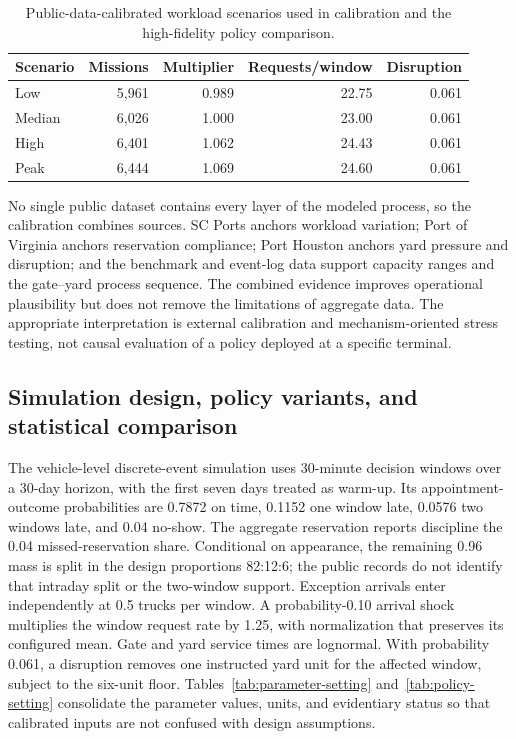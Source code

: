 \documentclass[preprint,12pt,authoryear,a4paper]{elsarticle}
\begin{document}
\begin{table}[htbp]
\centering
\caption{Public-data-calibrated workload scenarios used in calibration and the high-fidelity policy comparison.}
\label{tab:calibration-scenarios}
\footnotesize
\begin{tabular*}{\textwidth}{@{\extracolsep{\fill}}lrrrr@{}}
\toprule
Scenario & Missions & Multiplier & Requests/window & Disruption \\
\midrule
Low    & 5,961 & 0.989 & 22.75 & 0.061 \\
Median & 6,026 & 1.000 & 23.00 & 0.061 \\
High   & 6,401 & 1.062 & 24.43 & 0.061 \\
Peak   & 6,444 & 1.069 & 24.60 & 0.061 \\
\bottomrule
\end{tabular*}
\end{table}

No single public dataset contains every layer of the modeled process, so the calibration combines sources. SC Ports anchors workload variation; Port of Virginia anchors reservation compliance; Port Houston anchors yard pressure and disruption; and the benchmark and event-log data support capacity ranges and the gate--yard process sequence. The combined evidence improves operational plausibility but does not remove the limitations of aggregate data. The appropriate interpretation is external calibration and mechanism-oriented stress testing, not causal evaluation of a policy deployed at a specific terminal.

\subsection{Simulation design, policy variants, and statistical comparison}
\label{subsec:6-2-simulation-design-policies-and-statistical-comparison}

The vehicle-level discrete-event simulation uses 30-minute decision windows over a 30-day horizon, with the first seven days treated as warm-up. Its appointment-outcome probabilities are 0.7872 on time, 0.1152 one window late, 0.0576 two windows late, and 0.04 no-show. The aggregate reservation reports discipline the 0.04 missed-reservation share. Conditional on appearance, the remaining 0.96 mass is split in the design proportions 82:12:6; the public records do not identify that intraday split or the two-window support. Exception arrivals enter independently at 0.5 trucks per window. A probability-0.10 arrival shock multiplies the window request rate by 1.25, with normalization that preserves its configured mean. Gate and yard service times are lognormal. With probability 0.061, a disruption removes one instructed yard unit for the affected window, subject to the six-unit floor. Tables~\ref{tab:parameter-setting} and~\ref{tab:policy-setting} consolidate the parameter values, units, and evidentiary status so that calibrated inputs are not confused with design assumptions.
\end{document}
